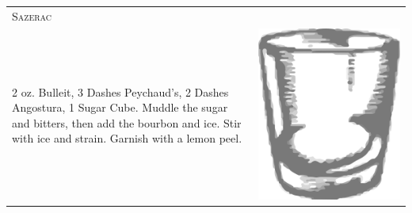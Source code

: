 \documentclass{article}
\begin{document}
\begin{tabular}{p{2in} p{0.5in}}
  \multicolumn{2}{p{3in}}{\centering\Huge\textsc{Sazerac}} \\ 
  
   \vspace{-0.1in}2 oz. Bulleit, 3 Dashes Peychaud's, 2 Dashes Angostura, 1
    Sugar Cube.  Muddle the sugar and bitters, then add the bourbon
    and ice. Stir with ice and strain. Garnish with a lemon peel. &
   \vspace{-0.1in} \includegraphics{rocks_glass.png}
\end{tabular}
\end{document}
